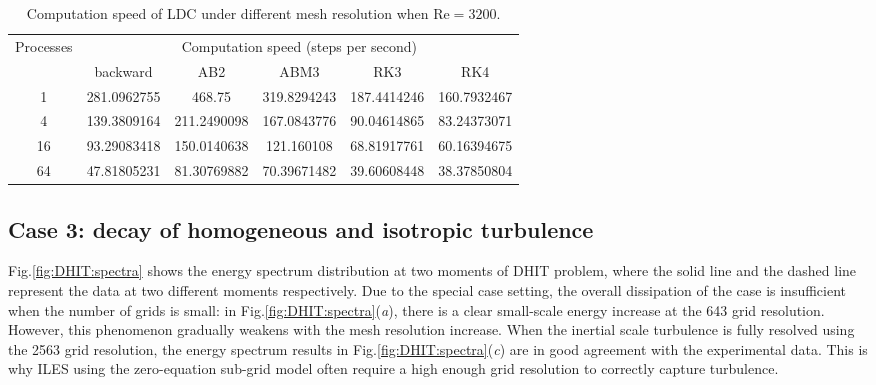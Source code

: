 \documentclass{article}
\begin{document}
\begin{table}
  \caption{Computation speed of LDC under different mesh resolution when $\mathrm{Re}=3200$.}
  \centering
  \begin{tabular}{cccccc}
    \toprule
    \multirow{2}{*}{Processes} & \multicolumn{5}{c}{Computation speed (steps per second)}            \\
    \cmidrule{2-6}
                               & backward    & AB2         & ABM3        & RK3         & RK4         \\
    \midrule
    1                          & 281.0962755 & 468.75      & 319.8294243 & 187.4414246 & 160.7932467 \\
    4                          & 139.3809164 & 211.2490098 & 167.0843776 & 90.04614865 & 83.24373071 \\
    16                         & 93.29083418 & 150.0140638 & 121.160108  & 68.81917761 & 60.16394675 \\
    64                         & 47.81805231 & 81.30769882 & 70.39671482 & 39.60608448 & 38.37850804 \\
    \bottomrule
    \end{tabular}
  \label{tab:LDC:3200}
\end{table}


\subsection{Case 3: decay of homogeneous and isotropic turbulence}

Fig.\ref{fig:DHIT:spectra} shows the energy spectrum distribution at two moments of DHIT problem, where the solid line and the dashed line represent the data at two different moments respectively. Due to the special case setting, the overall dissipation of the case is insufficient when the number of grids is small: in Fig.\ref{fig:DHIT:spectra}(\textit{a}), there is a clear small-scale energy increase at the 643 grid resolution. However, this phenomenon gradually weakens with the mesh resolution increase. When the inertial scale turbulence is fully resolved using the 2563 grid resolution, the energy spectrum results in Fig.\ref{fig:DHIT:spectra}(\textit{c}) are in good agreement with the experimental data. This is why ILES using the zero-equation sub-grid model often require a high enough grid resolution to correctly capture turbulence.
\end{document}
